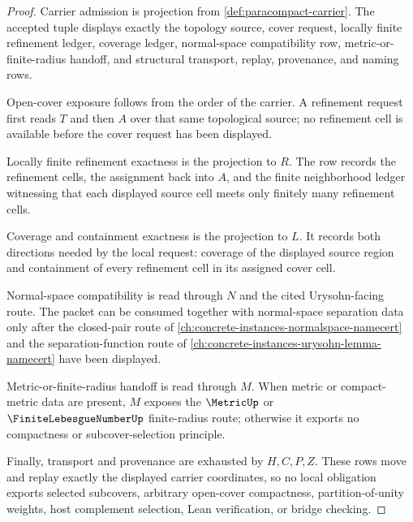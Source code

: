 \begin{proof}
Carrier admission is projection from \autoref{def:paracompact-carrier}. The accepted tuple displays exactly the topology source, cover request, locally finite refinement ledger, coverage ledger, normal-space compatibility row, metric-or-finite-radius handoff, and structural transport, replay, provenance, and naming rows.

Open-cover exposure follows from the order of the carrier. A refinement request first reads $T$ and then $A$ over that same topological source; no refinement cell is available before the cover request has been displayed.

Locally finite refinement exactness is the projection to $R$. The row records the refinement cells, the assignment back into $A$, and the finite neighborhood ledger witnessing that each displayed source cell meets only finitely many refinement cells.

Coverage and containment exactness is the projection to $L$. It records both directions needed by the local request: coverage of the displayed source region and containment of every refinement cell in its assigned cover cell.

Normal-space compatibility is read through $N$ and the cited Urysohn-facing route. The packet can be consumed together with normal-space separation data only after the closed-pair route of \autoref{ch:concrete-instances-normalspace-namecert} and the separation-function route of \autoref{ch:concrete-instances-urysohn-lemma-namecert} have been displayed.

Metric-or-finite-radius handoff is read through $M$. When metric or compact-metric data are present, $M$ exposes the $\MetricUp$ or $\FiniteLebesgueNumberUp$ finite-radius route; otherwise it exports no compactness or subcover-selection principle.

Finally, transport and provenance are exhausted by $H,C,P,Z$. These rows move and replay exactly the displayed carrier coordinates, so no local obligation exports selected subcovers, arbitrary open-cover compactness, partition-of-unity weights, host complement selection, Lean verification, or bridge checking.
\end{proof}

